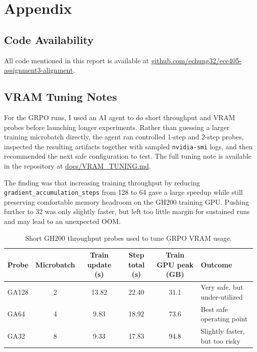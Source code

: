 \documentclass[letterpaper]{article}
\newcommand{\repofile}[2]{\href{https://github.com/echung32/ece405-assignment3-alignment/blob/main/#1}{#2}}
\begin{document}
	\appendix
	
	\section{Appendix}
	
	\subsection{Code Availability}
	
	All code mentioned in this report is available at \href{https://github.com/echung32/ece405-assignment3-alignment}{github.com/echung32/ece405-assignment3-alignment}.
	
	\subsection{VRAM Tuning Notes}
	
	For the GRPO runs, I used an AI agent to do short throughput and VRAM probes before launching longer experiments. Rather than guessing a larger training microbatch directly, the agent ran controlled 1-step and 2-step probes, inspected the resulting artifacts together with sampled \texttt{nvidia-smi} logs, and then recommended the next safe configuration to test. The full tuning note is available in the repository at \repofile{docs/VRAM_TUNING.md}{docs/VRAM\_TUNING.md}.
	
	The finding was that increasing training throughput by reducing \texttt{gradient\_accumulation\_steps} from 128 to 64 gave a large speedup while still preserving comfortable memory headroom on the GH200 training GPU. Pushing further to 32 was only slightly faster, but left too little margin for sustained runs and may lead to an unexpected OOM.
	
	\begin{table}[H]
		\centering
		\small
		\begin{tabular}{|l|c|c|c|c|l|}
			\hline
			Probe & Microbatch & Train update (s) & Step total (s) & Train GPU peak (GB) & Outcome \\
			\hline
			GA128 & 2 & 13.82 & 22.40 & 31.1 & Very safe, but under-utilized \\
			GA64 & 4 & 9.83 & 18.92 & 73.6 & Best safe operating point \\
			GA32 & 8 & 9.33 & 17.83 & 94.8 & Slightly faster, but too risky \\
			\hline
		\end{tabular}
		\caption{Short GH200 throughput probes used to tune GRPO VRAM usage.}
	\end{table}
	
\end{document}
